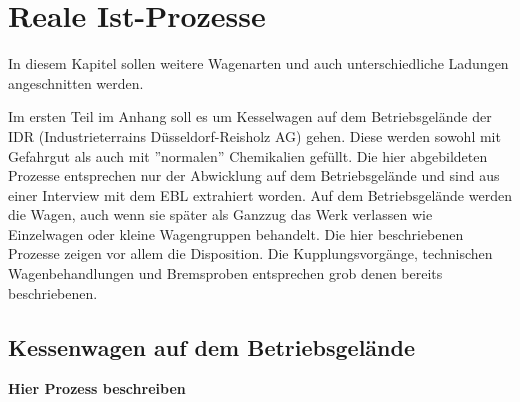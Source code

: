 \section{Reale Ist-Prozesse}\label{sec:realeIst}
In diesem Kapitel sollen weitere Wagenarten und auch unterschiedliche Ladungen angeschnitten werden.\par
Im ersten Teil im Anhang soll es um Kesselwagen auf dem Betriebsgelände der IDR (Industrieterrains Düsseldorf-Reisholz AG) gehen. Diese werden sowohl mit Gefahrgut als auch mit ''normalen'' Chemikalien gefüllt. Die hier abgebildeten Prozesse entsprechen nur der Abwicklung auf dem Betriebsgelände und sind aus einer Interview mit dem EBL extrahiert worden. Auf dem Betriebsgelände werden die Wagen, auch wenn sie später als Ganzzug das Werk verlassen wie Einzelwagen oder kleine Wagengruppen behandelt. Die hier beschriebenen Prozesse zeigen vor allem die Disposition. Die Kupplungsvorgänge, technischen Wagenbehandlungen und Bremsproben entsprechen grob denen bereits beschriebenen.
\subsection{Kessenwagen auf dem Betriebsgelände}
\textbf{Hier Prozess beschreiben}
